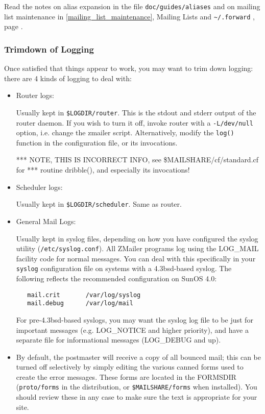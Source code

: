 Read the notes on alias expansion in the file {\tt doc/guides/aliases} and
on mailing list maintenance in \ref{mailing_list_maintenance}, 
Mailing Lists and \verb!~/.forward!%
, page \pageref{mailing_list_maintenance}%
.


\subsubsection{Trimdown of Logging}

Once satisfied that things appear to work, you may want to trim down
logging: there are 4 kinds of logging to deal with:
\begin{itemize}
\item Router logs:

Usually kept in {\tt \$LOGDIR/router}.  This is the stdout
and stderr output of the router daemon.  If you wish to turn it off,
invoke router with a {\tt -L/dev/null} option, i.e. change the zmailer
script.  Alternatively, modify the {\tt log()} function in the
configuration file, or its invocations.

*** NOTE, THIS IS INCORRECT INFO, see  \$MAILSHARE/cf/standard.cf for
*** routine   dribble(),  and especially its invocations!

\vspace{1pt}
\item Scheduler logs:

Usually kept in {\tt \$LOGDIR/scheduler}.  Same as router.

\vspace{1pt}
\item General Mail Logs:

Usually kept in syslog files, depending on how you have configured
the syslog utility ({\tt /etc/syslog.conf}).
All ZMailer programs log using the LOG\_MAIL facility code for normal
messages.  You can deal with this specifically in your {\tt syslog}
configuration file on systems with a 4.3bsd-based syslog.  The
following reflects the recommended configuration on SunOS 4.0:
\begin{verbatim}
   mail.crit       /var/log/syslog
   mail.debug      /var/log/mail
\end{verbatim}

For pre-4.3bsd-based syslogs, you may want the syslog log file
to be just for important messages (e.g. LOG\_NOTICE and higher
priority), and have a separate file for informational messages
(LOG\_DEBUG and up).

\vspace{1pt}
\item By default, the postmaster will receive a copy of all bounced
mail; this can be turned off selectively by simply editing the
various canned forms used to create the error messages.  These
forms are located in the FORMSDIR ({\tt proto/forms} in the distribution,
or {\tt \$MAILSHARE/forms} when installed).  You should review these
in any case to make sure the text is appropriate for your site.
\end{itemize}


